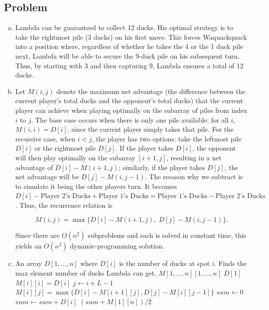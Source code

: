 \documentclass[12pt, letterpaper]{article}
\theoremstyle{definition}
\newcounter{problem}
\newcommand{\q}{
    \newpage %
    \stepcounter{problem} %
    \subsection*{Problem \arabic{problem}} %
}
\begin{document}
\q
\begin{enumerate}[(a)]
    \item Lambda can be guaranteed to collect 12 ducks. His optimal strategy is to take the rightmost pile (3 ducks) on his first move. This forces Waquackquack into a position where, regardless of whether he takes the 4 or the 1 duck pile next, Lambda will be able to secure the 9-duck pile on his subsequent turn. Thus, by starting with 3 and then capturing 9, Lambda ensures a total of 12 ducks.
    \item Let \( M(i, j) \) denote the maximum net advantage (the difference between the current player's total ducks and the opponent's total ducks) that the current player can achieve when playing optimally on the subarray of piles from index \( i \) to \( j \). The base case occurs when there is only one pile available: for all \( i \), \( M(i, i) = D[i] \), since the current player simply takes that pile. For the recursive case, when \( i < j \), the player has two options: take the leftmost pile \( D[i] \) or the rightmost pile \( D[j] \). If the player takes \( D[i] \), the opponent will then play optimally on the subarray \( [i+1, j] \), resulting in a net advantage of \( D[i] - M(i+1, j) \); similarly, if the player takes \( D[j] \), the net advantage will be \( D[j] - M(i, j-1) \). The reeason why we subtract is to simulate it being the other players turn. It becomes $D[i]-\text{Player 2's Ducks}+\text{Player 1's Ducks}=\text{Player 1's Ducks}-\text{Player 2's Ducks}$. Thus, the recurrence relation is

    \[
    M(i, j) = \max\{D[i] - M(i+1, j),\; D[j] - M(i, j-1)\}.
    \]
    
    Since there are \( O(n^2) \) subproblems and each is solved in constant time, this yields an \( O(n^2) \) dynamic-programming solution.
    \item \begin{algorithm}[H]
        \caption{Max Ducks}
        \begin{algorithmic}[1]
        \Require An array $D[1,\dots,n]$ where $D[i]$ is the number of ducks at spot $i$.
        \Ensure Finds the max element number of ducks Lambda can get.
            \State $M[1,\dots,n][1,\dots,n]$
                \State \Return $D[1]$
            \EndIf
                \State $M[i][i]=D[i]$
            \EndFor
                    \State $j \gets i + L - 1$
                    \State $M[i][j] = \max\{D[i] - M[i+1][j], D[j] - M[i][j-1]\}$
                \EndFor
            \EndFor
            \State $sum \gets 0$
                \State $sum \gets sum + D[i]$
            \EndFor
            \State \Return $(sum + M[1][n])/2$
        \EndFunction
        \end{algorithmic}
        \end{algorithm}


\end{enumerate}
\end{document}
